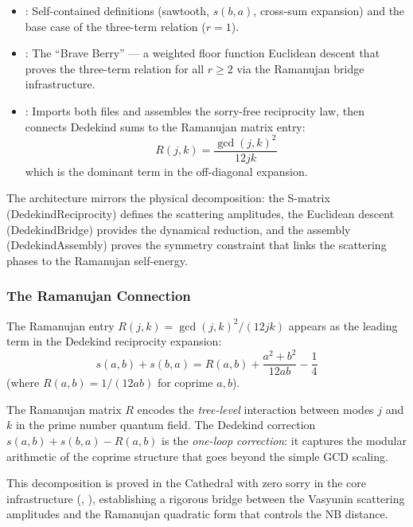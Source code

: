 \begin{itemize}
  \item {}: Self-contained definitions
    (sawtooth, $s(b,a)$, cross-sum expansion) and the base case
    of the three-term relation ($r = 1$).

  \item {}: The ``Brave Berry'' --- a weighted
    floor function Euclidean descent that proves the three-term relation
    for all $r \geq 2$ via the Ramanujan bridge infrastructure.

  \item {}: Imports both files and assembles
    the sorry-free reciprocity law, then connects Dedekind sums
    to the Ramanujan matrix entry:
    \[
      R(j,k) = \frac{\gcd(j,k)^2}{12jk}
    \]
    which is the dominant term in the off-diagonal expansion.
\end{itemize}

The architecture mirrors the physical decomposition: the S-matrix
(DedekindReciprocity) defines the scattering amplitudes, the
Euclidean descent (DedekindBridge) provides the dynamical reduction,
and the assembly (DedekindAssembly) proves the symmetry constraint
that links the scattering phases to the Ramanujan self-energy.

\subsubsection{The Ramanujan Connection}

The Ramanujan entry $R(j,k) = \gcd(j,k)^2/(12jk)$ appears as the
leading term in the Dedekind reciprocity expansion:
\[
  s(a,b) + s(b,a) = R(a,b) + \frac{a^2 + b^2}{12ab} - \frac{1}{4}
\]
(where $R(a,b) = 1/(12ab)$ for coprime $a,b$).

The Ramanujan matrix $R$ encodes the \emph{tree-level}
interaction between modes $j$ and $k$ in the prime number quantum field.
The Dedekind correction $s(a,b) + s(b,a) - R(a,b)$ is the
\emph{one-loop correction}: it captures the modular arithmetic of
the coprime structure that goes beyond the simple GCD scaling.

This decomposition is proved in the Cathedral with zero sorry
in the core infrastructure (,
), establishing a rigorous bridge
between the Vasyunin scattering amplitudes and the Ramanujan
quadratic form that controls the NB distance.
